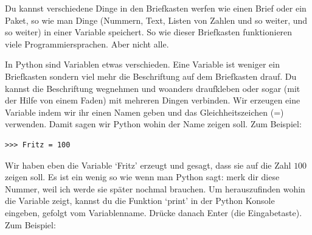 Du kannst verschiedene Dinge in den Briefkasten werfen wie einen Brief oder ein Paket, so wie man Dinge (Nummern, Text, Listen von Zahlen und so weiter, und so weiter) in einer Variable speichert. So wie dieser Briefkasten funktionieren viele Programmiersprachen. Aber nicht alle.

In Python sind Variablen etwas verschieden. Eine Variable ist weniger ein Briefkasten sondern viel mehr die Beschriftung auf dem Briefkasten drauf. Du kannst die Beschriftung wegnehmen und woanders draufkleben oder sogar (mit der Hilfe von einem Faden) mit mehreren Dingen verbinden. Wir erzeugen eine Variable indem wir ihr einen Namen geben und das Gleichheitszeichen (=) verwenden. Damit sagen wir Python wohin der Name zeigen soll. Zum Beispiel:

\begin{Verbatim}[frame=single]
>>> Fritz = 100
\end{Verbatim}

Wir haben eben die Variable `Fritz' erzeugt und gesagt, dass sie auf die Zahl $100$ zeigen soll. Es ist ein wenig so wie wenn man Python sagt: merk dir diese Nummer, weil ich werde sie später nochmal brauchen. Um herauszufinden wohin die Variable zeigt, kannst du die Funktion `print' in der Python Konsole eingeben, gefolgt vom Variablenname. Drücke danach Enter (die Eingabetaste). Zum Beispiel:

